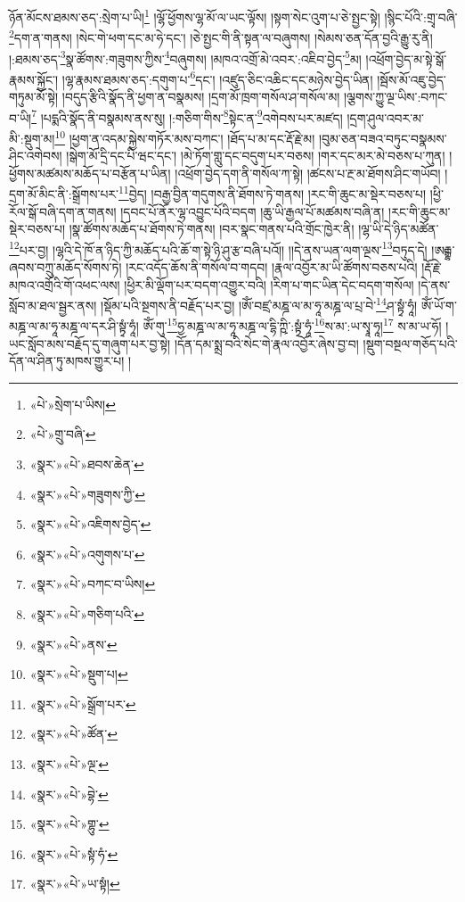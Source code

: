 ཉོན་མོངས་ཐམས་ཅད་:སྲེག་པ་ཡི།\footnote{«པེ་»སྲེག་པ་ཡིས།} །ལྷོ་ཕྱོགས་ལྷ་མོ་ལ་ཡང་ལྟོས། །སྟག་སེང་འུག་པ་ཅེ་སྤྱང་སྟེ། །སྙིང་པོའི་:གྲྭ་བཞི་\footnote{«པེ་»གྲུ་བཞི་}དག་ན་གནས། །སེང་གེ་ཕག་དང་མ་ཧེ་དང་། །ཅེ་སྤྱང་གི་ནི་སྟན་ལ་བཞུགས། །སེམས་ཅན་དོན་བྱའི་རྒྱུ་རུ་ནི། །:ཐམས་ཅད་\footnote{«སྣར་»«པེ་»ཐབས་ཆེན་}སྣ་ཚོགས་:གཟུགས་ཀྱིས་\footnote{«སྣར་»«པེ་»གཟུགས་ཀྱི་}བཞུགས། །མཁའ་འགྲོ་མེ་འབར་:འཇིབ་བྱེད་\footnote{«སྣར་»«པེ་»འཇིགས་བྱེད་}མ། །འཕྲོག་བྱེད་མ་སྟེ་སྒོ་རྣམས་སྐྱོང་། །ལྷ་རྣམས་ཐམས་ཅད་:དགུག་པ་\footnote{«སྣར་»«པེ་»འགུགས་པ་}དང་། །འཛུད་ཅིང་འཆིང་དང་མཉེས་བྱེད་ཡིན། །སྦོས་མོ་འཇུ་བྱེད་གཏུམ་མོ་སྟེ། །བདུད་རྩིའི་སྣོད་ནི་ཕྱག་ན་བསྣམས། །དྲག་མོ་ཁྲག་གསོལ་ཤ་གསོལ་མ། །ལྕགས་ཀྱུ་ལྔ་ཡིས་:བཀང་བ་ཡི།\footnote{«སྣར་»«པེ་»བཀང་བ་ཡིས།} །པདྨའི་སྣོད་ནི་བསྣམས་ནས་སུ། །:གཅིག་གིས་\footnote{«སྣར་»«པེ་»གཅིག་པའི་}སྟེང་ན་\footnote{«སྣར་»«པེ་»ནས་}འགེབས་པར་མཛད། །དྲག་ཤུལ་འབར་མ་མི་:སྡུག་མ།\footnote{«སྣར་»«པེ་»སྡུག་པ།} །ཕྱག་ན་འདམ་སྐྱེས་གཏོར་མས་བཀང་། །ཐོད་པ་མ་དང་རྡོ་རྗེ་མ། །བུམ་ཅན་བཟའ་བཏུང་བསྣམས་ཤིང་འགེབས། །སྒེག་མོ་དྲི་དང་པི་ཝང་དང་། །མེ་ཏོག་གླུ་དང་བདུག་པར་བཅས། །གར་དང་མར་མེ་བཅས་པ་ཀུན། །ཕྱོགས་མཚམས་མཆོད་པ་བརྩོན་པ་ཡིན། །འཕྲོག་བྱེད་དག་ནི་གསོལ་ཀ་སྟེ། །ཚངས་པ་རྔ་མ་ཐོགས་ཤིང་གཡོབ། །དྲག་མོ་མིང་ནི་:སྒྲོགས་པར་\footnote{«སྣར་»«པེ་»སྒྲོག་པར་}བྱེད། །བརྒྱ་བྱིན་གདུགས་ནི་ཐོགས་ཏེ་གནས། །རང་གི་ཆུང་མ་སྡེར་བཅས་པ། །ཕྱི་རོལ་སྒོ་བཞི་དག་ན་གནས། །དབང་པོ་ནོར་ལྷ་འབྱུང་པོའི་བདག །ཆུ་ཡི་རྒྱལ་པོ་མཚམས་བཞི་ན། །རང་གི་ཆུང་མ་སྡེར་བཅས་པ། །སྣ་ཚོགས་མཆོད་པ་ཐོགས་ཏེ་གནས། །བར་སྣང་གནས་པའི་གྲོང་ཁྱེར་ནི། །ལྷ་ཡི་དེ་ཉིད་མཚོན་\footnote{«སྣར་»«པེ་»ཚོན་}པར་བྱ། །ལྷའི་དེ་ཁོ་ན་ཉིད་ཀྱི་མཆོད་པའི་ཆོ་ག་སྟེ་ཉི་ཤུ་རྩ་བཞི་པའོ།། །།དེ་ནས་ཡན་ལག་ལྔས་\footnote{«སྣར་»«པེ་»ལྔ་}བཏུད་དེ། །ཨརྒྷ་ཞབས་བཀྲུ་མཆོད་སོགས་ཏེ། །རང་འདོད་ཆོས་ནི་གསོལ་བ་གདབ། །རྣལ་འབྱོར་མ་ཡི་ཚོགས་བཅས་པའི། །རྡོ་རྗེ་མཁའ་འགྲོའི་གོ་འཕང་ལས། །ཕྱིར་མི་ལྡོག་པར་བདག་འགྱུར་བའི། །རིག་པ་གང་ཡིན་དེང་བདག་གསོལ། །དེ་ནས་སློབ་མ་ཐལ་སྦྱར་ནས། །སྡོམ་པའི་སྔགས་ནི་བརྗོད་པར་བྱ། །ཨོཾ་བཛྲ་མཎྜ་ལ་མ་ཧཱ་མཎྜ་ལ་པྲ་བེ་\footnote{«སྣར་»«པེ་»བྷེ་}ཤ་སྟྭཾ་ཧཱཾ། ཨོཾ་ཡོ་ག་མཎྜ་ལ་མ་ཧཱ་མཎྜ་ལ་དར་ཤི་སྟྭཾ་ཧཱཾ། ཨོཾ་གུ་\footnote{«སྣར་»«པེ་»གྷུ་}ཧྱ་མཎྜ་ལ་མ་ཧཱ་མཎྜ་ལ་དྷི་ཀྵི་:སྟྭཾ་ཧཱཾ་\footnote{«སྣར་»«པེ་»སྟཾ་ཧཾ་}ས་མ་:ཡ་སྭཱ་ཧཱ།\footnote{«སྣར་»«པེ་»ཡ་སྟཾ།} ས་མ་ཡ་ཧོ། །ཡང་སློབ་མས་བརྗོད་དུ་གཞུག་པར་བྱ་སྟེ། །དོན་དམ་སྨྲ་བའི་སེང་གེ་རྣལ་འབྱོར་ཞེས་བྱ་བ། །སྡུག་བསྔལ་གཅོད་པའི་དོན་ལ་ཤིན་ཏུ་མཁས་གྱུར་པ། །

